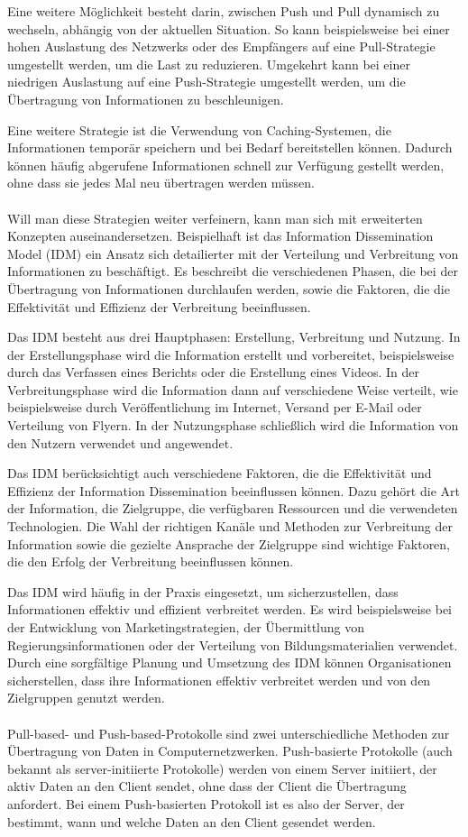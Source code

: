 \documentclass[../vs-script-first-v01.tex]{subfiles}
\begin{document}
Eine weitere Möglichkeit besteht darin, zwischen Push und Pull dynamisch zu wechseln, abhängig von der aktuellen Situation. So kann beispielsweise bei einer hohen Auslastung des Netzwerks oder des Empfängers auf eine Pull-Strategie umgestellt werden, um die Last zu reduzieren. Umgekehrt kann bei einer niedrigen Auslastung auf eine Push-Strategie umgestellt werden, um die Übertragung von Informationen zu beschleunigen.

Eine weitere Strategie ist die Verwendung von Caching-Systemen, die Informationen temporär speichern und bei Bedarf bereitstellen können. Dadurch können häufig abgerufene Informationen schnell zur Verfügung gestellt werden, ohne dass sie jedes Mal neu übertragen werden müssen.
\\\\
Will man diese Strategien weiter verfeinern, kann man sich mit erweiterten Konzepten auseinandersetzen. Beispielhaft ist das Information Dissemination Model (IDM) ein Ansatz sich detailierter mit der Verteilung und Verbreitung von Informationen zu beschäftigt. Es beschreibt die verschiedenen Phasen, die bei der Übertragung von Informationen durchlaufen werden, sowie die Faktoren, die die Effektivität und Effizienz der Verbreitung beeinflussen.

Das IDM besteht aus drei Hauptphasen: Erstellung, Verbreitung und Nutzung. In der Erstellungsphase wird die Information erstellt und vorbereitet, beispielsweise durch das Verfassen eines Berichts oder die Erstellung eines Videos. In der Verbreitungsphase wird die Information dann auf verschiedene Weise verteilt, wie beispielsweise durch Veröffentlichung im Internet, Versand per E-Mail oder Verteilung von Flyern. In der Nutzungsphase schließlich wird die Information von den Nutzern verwendet und angewendet.

Das IDM berücksichtigt auch verschiedene Faktoren, die die Effektivität und Effizienz der Information Dissemination beeinflussen können. Dazu gehört die Art der Information, die Zielgruppe, die verfügbaren Ressourcen und die verwendeten Technologien. Die Wahl der richtigen Kanäle und Methoden zur Verbreitung der Information sowie die gezielte Ansprache der Zielgruppe sind wichtige Faktoren, die den Erfolg der Verbreitung beeinflussen können.

Das IDM wird häufig in der Praxis eingesetzt, um sicherzustellen, dass Informationen effektiv und effizient verbreitet werden. Es wird beispielsweise bei der Entwicklung von Marketingstrategien, der Übermittlung von Regierungsinformationen oder der Verteilung von Bildungsmaterialien verwendet. Durch eine sorgfältige Planung und Umsetzung des IDM können Organisationen sicherstellen, dass ihre Informationen effektiv verbreitet werden und von den Zielgruppen genutzt werden.
\\\\
Pull-based- und Push-based-Protokolle sind zwei unterschiedliche Methoden zur Übertragung von Daten in Computernetzwerken. Push-basierte Protokolle (auch bekannt als server-initiierte Protokolle) werden von einem Server initiiert, der aktiv Daten an den Client sendet, ohne dass der Client die Übertragung anfordert. Bei einem Push-basierten Protokoll ist es also der Server, der bestimmt, wann und welche Daten an den Client gesendet werden.
\end{document}
